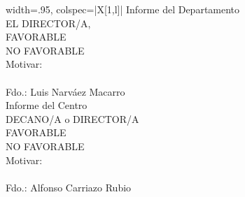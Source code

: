 \documentclass[a4paper,10pt]{article}
\begin{document}
\begin{minipage}{0.3\textwidth}
\begin{longtblr}[l]{width=.95\textwidth, colspec={|X[1,l]|}}
\hline
\centering Informe del Departamento \\[-2mm]
\centering EL DIRECTOR/A, \\[3mm]
FAVORABLE\hspace{18mm}\Large\Square \\[-2mm]
NO FAVORABLE\hspace{12.15mm}\Large\Square \\[-2mm]
Motivar: \\
{} \\[35mm]
Fdo.: Luis Narváez Macarro \\
\hline
\centering Informe del Centro \\[-2mm]
\centering DECANO/A o DIRECTOR/A \\[3mm]
FAVORABLE\hspace{18mm}\Large\Square \\[-2mm]
NO FAVORABLE\hspace{12.15mm}\Large\Square \\[-2mm]
Motivar: \\
{} \\[35mm]
Fdo.: Alfonso Carriazo Rubio \\
\hline
\end{longtblr}
\end{minipage}
\end{document}
